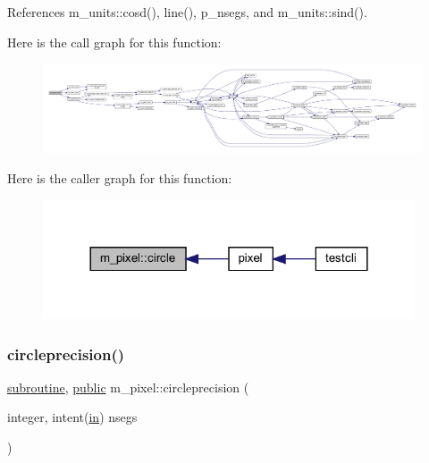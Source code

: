References m\+\_\+units\+::cosd(), line(), p\+\_\+nsegs, and m\+\_\+units\+::sind().

Here is the call graph for this function\+:
\nopagebreak
\begin{figure}[H]
\begin{center}
\leavevmode
\includegraphics[width=350pt]{namespacem__pixel_ab3b12cc498ed490014aa5fcc0bb278d2_cgraph}
\end{center}
\end{figure}
Here is the caller graph for this function\+:
\nopagebreak
\begin{figure}[H]
\begin{center}
\leavevmode
\includegraphics[width=312pt]{namespacem__pixel_ab3b12cc498ed490014aa5fcc0bb278d2_icgraph}
\end{center}
\end{figure}
\mbox{\label{namespacem__pixel_a68ca1be8f7a92ece6efce8d69987af9c}} 
\subsubsection{\texorpdfstring{circleprecision()}{circleprecision()}}
{\footnotesize\ttfamily \hyperlink{M__stopwatch_83_8txt_acfbcff50169d691ff02d4a123ed70482}{subroutine}, \hyperlink{M__stopwatch_83_8txt_a2f74811300c361e53b430611a7d1769f}{public} m\+\_\+pixel\+::circleprecision (\begin{DoxyParamCaption}\item[{integer, intent(\hyperlink{M__journal_83_8txt_afce72651d1eed785a2132bee863b2f38}{in})}]{nsegs }\end{DoxyParamCaption})}



